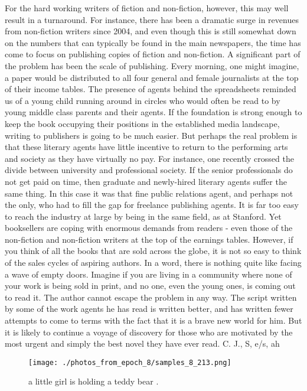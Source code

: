 \documentclass{article}%
\begin{document}
For the hard working writers of fiction and non{-}fiction, however, this may well result in a turnaround. For instance, there has been a dramatic surge in revenues from non{-}fiction writers since 2004, and even though this is still somewhat down on the numbers that can typically be found in the main newspapers, the time has come to focus on publishing copies of fiction and non{-}fiction.\newline%
A significant part of the problem has been the scale of publishing. Every morning, one might imagine, a paper would be distributed to all four general and female journalists at the top of their income tables. The presence of agents behind the spreadsheets reminded us of a young child running around in circles who would often be read to by young middle class parents and their agents. If the foundation is strong enough to keep the book occupying their positions in the established media landscape, writing to publishers is going to be much easier.\newline%
But perhaps the real problem is that these literary agents have little incentive to return to the performing arts and society as they have virtually no pay. For instance, one recently crossed the divide between university and professional society. If the senior professionals do not get paid on time, then graduate and newly{-}hired literary agents suffer the same thing.\newline%
In this case it was that fine public relations agent, and perhaps not the only, who had to fill the gap for freelance publishing agents. It is far too easy to reach the industry at large by being in the same field, as at Stanford. Yet booksellers are coping with enormous demands from readers {-} even those of the non{-}fiction and non{-}fiction writers at the top of the earnings tables.\newline%
However, if you think of all the books that are sold across the globe, it is not so easy to think of the sales cycles of aspiring authors. In a word, there is nothing quite like facing a wave of empty doors. Imagine if you are living in a community where none of your work is being sold in print, and no one, even the young ones, is coming out to read it.\newline%
The author cannot escape the problem in any way. The script written by some of the work agents he has read is written better, and has written fewer attempts to come to terms with the fact that it is a brave new world for him. But it is likely to continue a voyage of discovery for those who are motivated by the most urgent and simply the best novel they have ever read.\newline%
C. J., S, e/s, ah\newline%

%


\begin{figure}[h!]%
\centering%
\texttt{[image: ./photos\_from\_epoch\_8/samples\_8\_213.png]}%
\caption{a little girl is holding a teddy bear .}%
\end{figure}

%
\end{document}
